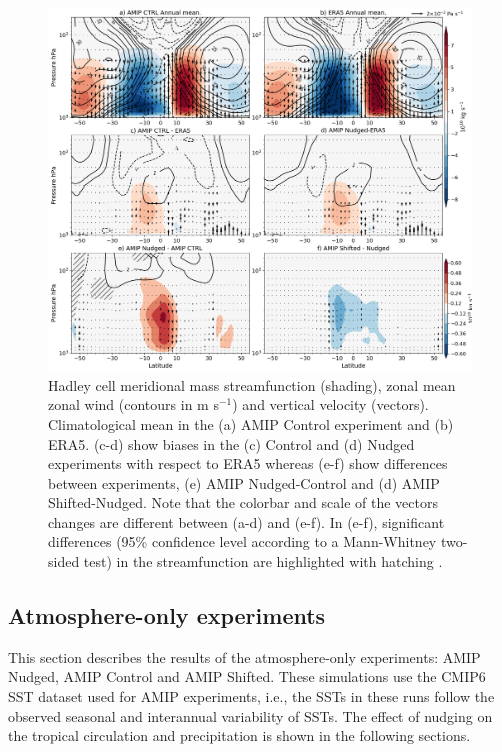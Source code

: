 \begin{figure}[t!]
\centering
 \includegraphics[width=\linewidth]{figures/suite_streamhadleyclim.png}
\caption[Hadley cell in atmosphere-only experiments]{Hadley cell meridional mass streamfunction (shading), zonal mean zonal wind (contours in m s$^{-1}$) and vertical velocity (vectors). Climatological mean in the (a) AMIP Control experiment and (b) ERA5. (c-d) show biases in the (c) Control and (d) Nudged experiments with respect to ERA5 whereas (e-f) show differences between experiments, (e) AMIP Nudged-Control and (d) AMIP Shifted-Nudged. Note that the colorbar and scale of the vectors changes are different between (a-d) and (e-f). In (e-f), significant differences (95\% confidence level according to a Mann-Whitney two-sided test) in the streamfunction are highlighted with hatching . }
\label{fig:hadleyamip}
\end{figure}

\subsection{Atmosphere-only experiments}

This section describes the results of the atmosphere-only experiments: AMIP Nudged, AMIP Control and AMIP Shifted. These simulations use the CMIP6 SST dataset used for AMIP experiments, i.e.,  the SSTs in these runs follow the observed seasonal and interannual variability of SSTs. 
The effect of nudging on the tropical circulation and precipitation is shown in the following sections. %

